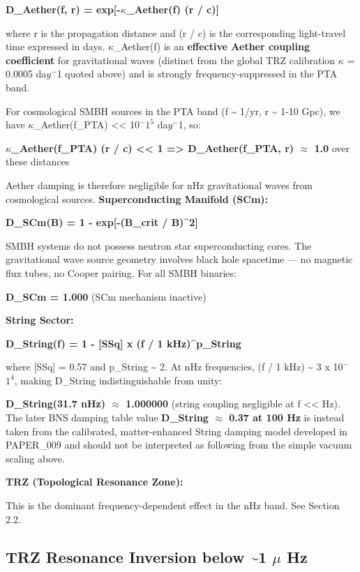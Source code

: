 \documentclass[12pt,a4paper]{article}
\begin{document}
\textbf{D\_Aether(f, r) = exp[-$\kappa$\_Aether(f) (r / c)]}

where r is the propagation distance and (r / c) is the corresponding light-travel time expressed in days. $\kappa$\_Aether(f) is an \textbf{effective Aether coupling coefficient} for gravitational waves (distinct from the global TRZ calibration $\kappa$ = 0.0005 da$y^{-}$1 quoted above) and is strongly frequency-suppressed in the PTA band.

For cosmological SMBH sources in the PTA band (f \textasciitilde{} 1/yr, r \textasciitilde{} 1-10 Gpc), we have $\kappa$\_Aether(f\_PTA) << 1$0^{-}$$1^{5}$ da$y^{-}$1, so:

\textbf{$\kappa$\_Aether(f\_PTA) (r / c) << 1 => D\_Aether(f\_PTA, r) $\approx$ 1.0} over these distances

Aether damping is therefore negligible for nHz gravitational waves from cosmological sources. \textbf{Superconducting Manifold (SCm):}

\textbf{D\_SCm(B) = 1 - exp[-(B\_crit / B)\^{}2]}

SMBH systems do not possess neutron star superconducting cores. The gravitational wave source geometry involves black hole spacetime --- no magnetic flux tubes, no Cooper pairing. For all SMBH binaries:

\textbf{D\_SCm = 1.000} (SCm mechanism inactive)

\textbf{String Sector:}

\textbf{D\_String(f) = 1 - [SSq] x (f / 1 kHz)\^{}{p\_String}}

where [SSq] = 0.57 and p\_String \textasciitilde{} 2. At nHz frequencies, (f / 1 kHz) \textasciitilde{} 3 x 1$0^{-}$$1^{4}$, making D\_String indistinguishable from unity:

\textbf{D\_String(31.7 nHz) $\approx$ 1.000000} (string coupling negligible at f << Hz). The later BNS damping table value \textbf{D\_String $\approx$ 0.37 at 100 Hz} is instead taken from the calibrated, matter-enhanced String damping model developed in PAPER\_009 and should not be interpreted as following from the simple vacuum scaling above.

\textbf{TRZ (Topological Resonance Zone):}

This is the dominant frequency-dependent effect in the nHz band. See Section 2.2.

\subsection{TRZ Resonance Inversion below \textasciitilde{}1 $\mu$ Hz}
\end{document}
